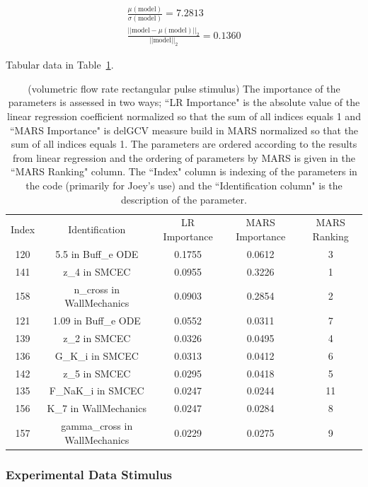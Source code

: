 \documentclass[12pt]{article}
\numberwithin{equation}{section}
\begin{document}
\begin{eqnarray*}
\frac{\mu(\text{model})}{\sigma(\text{model})} = 7.2813\\
\frac{\vert \vert \text{model}-\mu(\text{model}) \vert \vert_2 }{\vert \vert \text{model}\vert \vert_2 } = 0.1360
\end{eqnarray*}

Tabular data in Table~\ref{qoi_vol_flow_rec}.

\begin{table}[h]
\centering
\begin{tabular}{ccccc}
Index & Identification & LR Importance & MARS Importance & MARS Ranking \\
   120 & 5.5 in Buff\_e ODE & 0.1755 & 0.0612 & 3\\
   141 & z\_4 in SMCEC &  0.0955 & 0.3226 & 1\\
   158 & n\_cross in WallMechanics & 0.0903 & 0.2854 & 2\\
   121 & 1.09 in Buff\_e ODE & 0.0552 & 0.0311 & 7\\
   139 & z\_2 in SMCEC & 0.0326 & 0.0495 & 4\\
   136 & G\_K\_i in SMCEC & 0.0313 & 0.0412 & 6\\
   142 & z\_5 in SMCEC & 0.0295 & 0.0418 & 5\\
   135 & F\_NaK\_i in SMCEC & 0.0247 & 0.0244 & 11\\
   156 & K\_7 in WallMechanics & 0.0247 & 0.0284 & 8\\
   157 & gamma\_cross in WallMechanics & 0.0229 & 0.0275 & 9
\end{tabular}
\caption{(volumetric flow rate rectangular pulse stimulus) The importance of the parameters is assessed in two ways; ``LR Importance" is the absolute value of the linear regression coefficient normalized so that the sum of all indices equals 1 and ``MARS Importance" is delGCV measure build in MARS normalized so that the sum of all indices equals 1. The parameters are ordered according to the results from linear regression and the ordering of parameters by MARS is given in the ``MARS Ranking" column. The ``Index" column is indexing of the parameters in the code (primarily for Joey's use) and the ``Identification column" is the description of the parameter.}
\label{qoi_vol_flow_rec}
\end{table}

\newpage

\subsubsection{Experimental Data Stimulus}
\end{document}
